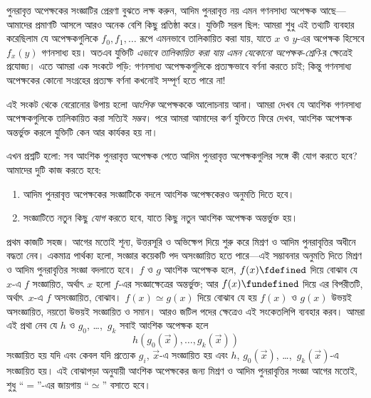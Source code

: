 \documentclass[../../../include/open-logic-section]{subfiles}
\begin{document}


পুনরাবৃত্ত অপেক্ষকের সংজ্ঞাটির প্রেরণা বুঝতে লক্ষ করুন, আদিম পুনরাবৃত্ত
নয় এমন গণনসাধ্য অপেক্ষক আছে—আমাদের প্রমাণটি আসলে আরও অনেক বেশি কিছু
প্রতিষ্ঠা করে। যুক্তিটি সরল ছিল: আমরা শুধু এই তথ্যটি ব্যবহার করেছিলাম যে
অপেক্ষকগুলিকে $f_0,f_1,\dots$ রূপে এমনভাবে তালিকায়িত করা যায়, যাতে
$x$ ও $y$-এর অপেক্ষক হিসেবে $f_x(y)$ গণনসাধ্য হয়। অতএব যুক্তিটি
\emph{এভাবে তালিকায়িত করা যায় এমন যেকোনো অপেক্ষক-শ্রেণি}-র ক্ষেত্রেই
প্রযোজ্য। এতে আমরা এক সংকটে পড়ি: গণনসাধ্য অপেক্ষকগুলিকে প্রত্যক্ষভাবে
বর্ণনা করতে চাই; কিন্তু গণনসাধ্য অপেক্ষকের কোনো সংগ্রহের প্রত্যক্ষ বর্ণনা
কখনোই সম্পূর্ণ হতে পারে না!

এই সংকট থেকে বেরোনোর উপায় হলো \emph{আংশিক} অপেক্ষককে আলোচনায় আনা।
আমরা দেখব যে আংশিক গণনসাধ্য অপেক্ষকগুলিকে তালিকায়িত করা সত্যিই
\emph{সম্ভব}। পরে আমরা
আমাদের কর্ণ যুক্তিতে ফিরে দেখব, আংশিক অপেক্ষক অন্তর্ভুক্ত করলে যুক্তিটি
কেন আর কার্যকর হয় না।

এখন প্রশ্নটি হলো: সব আংশিক পুনরাবৃত্ত অপেক্ষক পেতে আদিম পুনরাবৃত্ত
অপেক্ষকগুলির সঙ্গে কী যোগ করতে হবে? আমাদের দুটি কাজ করতে হবে:
\begin{enumerate}
\item আদিম পুনরাবৃত্ত অপেক্ষকের সংজ্ঞাটিকে বদলে আংশিক অপেক্ষকেরও অনুমতি
  দিতে হবে।
\item সংজ্ঞাটিতে নতুন কিছু \emph{যোগ} করতে হবে, যাতে কিছু নতুন আংশিক
  অপেক্ষক অন্তর্ভুক্ত হয়।
\end{enumerate}

প্রথম কাজটি সহজ। আগের মতোই শূন্য, উত্তরসূরি ও অভিক্ষেপ দিয়ে শুরু করে
মিশ্রণ ও আদিম পুনরাবৃত্তির অধীনে বদ্ধতা নেব। একমাত্র পার্থক্য হলো,
সংজ্ঞার কয়েকটি পদ অসংজ্ঞায়িত হতে পারে—এই সম্ভাবনার অনুমতি দিতে মিশ্রণ
ও আদিম পুনরাবৃত্তির সংজ্ঞা বদলাতে হবে। $f$ ও $g$ আংশিক অপেক্ষক হলে,
$f(x) \fdefined$ দিয়ে বোঝাব যে $x$-এ $f$ সংজ্ঞায়িত, অর্থাৎ $x$ হলো
$f$-এর সংজ্ঞাক্ষেত্রের অন্তর্ভুক্ত; আর $f(x) \fundefined$ দিয়ে এর
বিপরীতটি, অর্থাৎ~$x$-এ $f$ অসংজ্ঞায়িত, বোঝাব। $f(x) \simeq g(x)$ দিয়ে
বোঝাব যে হয় $f(x)$ ও $g(x)$ উভয়ই অসংজ্ঞায়িত, নয়তো উভয়ই সংজ্ঞায়িত
ও সমান। আরও জটিল পদের ক্ষেত্রেও এই সংকেতলিপি ব্যবহার করব। আমরা এই
প্রথা নেব যে $h$ ও $g_0$, \dots,~$g_k$ সবাই আংশিক অপেক্ষক হলে
\[
h(g_0(\vec x),\dots,g_k(\vec x))
\]
সংজ্ঞায়িত হয় যদি এবং কেবল যদি প্রত্যেক $g_i$, $\vec x$-এ সংজ্ঞায়িত
হয় এবং $h$, $g_0(\vec x)$, \dots,~$g_k(\vec x)$-এ সংজ্ঞায়িত হয়। এই
বোঝাপড়া অনুযায়ী আংশিক অপেক্ষকের জন্য মিশ্রণ ও আদিম পুনরাবৃত্তির সংজ্ঞা
আগের মতোই, শুধু “$=$”-এর জায়গায় “$\simeq$” বসাতে হবে।
\end{document}
